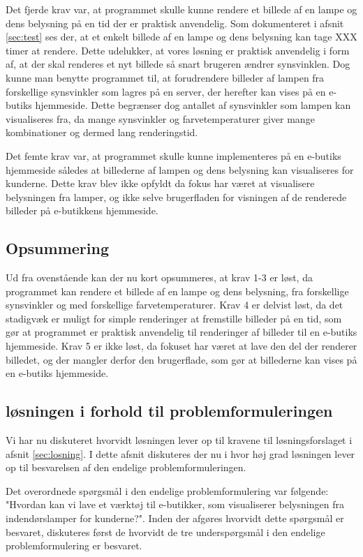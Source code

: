 Det fjerde krav var, at programmet skulle kunne rendere et billede af en lampe og dens belysning på en tid der er praktisk anvendelig. Som dokumenteret i afsnit \ref{sec:test} ses der, at et enkelt billede af en lampe og dens belysning kan tage XXX timer at rendere. Dette udelukker, at vores løsning er praktisk anvendelig i form af, at der skal renderes et nyt billede så snart brugeren ændrer synsvinklen. Dog kunne man benytte programmet til, at forudrendere billeder af lampen fra forskellige synsvinkler som lagres på en server, der herefter kan vises på en e-butiks hjemmeside. Dette begrænser dog antallet af synsvinkler som lampen kan visualiseres fra, da mange synsvinkler og farvetemperaturer giver mange kombinationer og dermed lang renderingstid.

Det femte krav var, at programmet skulle kunne implementeres på en e-butiks hjemmeside således at billederne af lampen og dens belysning kan visualiseres for kunderne. Dette krav blev ikke opfyldt da fokus har været at visualisere belysningen fra lamper, og ikke selve brugerfladen for visningen af de renderede billeder på e-butikkens hjemmeside.  

\subsection*{Opsummering}

Ud fra ovenstående kan der nu kort opsummeres, at krav 1-3 er løst, da programmet kan rendere et billede af en lampe og dens belysning, fra forskellige synsvinkler og med forskellige farvetemperaturer. Krav 4 er delvist løst, da det stadigvæk er muligt for simple renderinger at fremstille billeder på en tid, som gør at programmet er praktisk anvendelig til renderinger af billeder til en e-butiks hjemmeside. Krav 5 er ikke løst, da fokuset har været at lave den del der renderer billedet, og der mangler derfor den brugerflade, som gør at billederne kan vises på en e-butiks hjemmeside. 

\subsection{løsningen i forhold til problemformuleringen}
 Vi har nu diskuteret hvorvidt løsningen lever op til kravene til løsningsforslaget i afsnit \ref{sec:losning}. I dette afsnit diskuteres der nu i hvor høj grad løsningen lever op til besvarelsen af den endelige problemformuleringen.

Det overordnede spørgsmål i den endelige problemformulering var følgende: "Hvordan kan vi lave et værktøj til e-butikker, som visualiserer belysningen fra indendørslamper for kunderne?". Inden  der afgøres hvorvidt dette spørgsmål er besvaret, diskuteres først de hvorvidt de tre underspørgsmål i den endelige problemformulering er besvaret.

